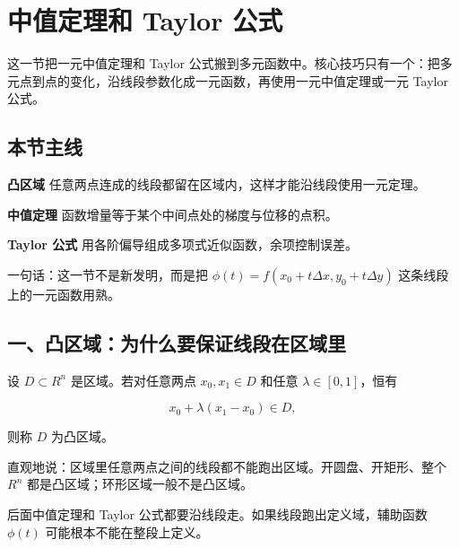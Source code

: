 \section{中值定理和 Taylor 公式}

这一节把一元中值定理和 Taylor 公式搬到多元函数中。核心技巧只有一个：把多元点到点的变化，沿线段参数化成一元函数，再使用一元中值定理或一元 Taylor 公式。

\subsection*{本节主线}

\begin{conceptbox}
\textbf{凸区域}
任意两点连成的线段都留在区域内，这样才能沿线段使用一元定理。
\end{conceptbox}

\begin{conceptbox}
\textbf{中值定理}
函数增量等于某个中间点处的梯度与位移的点积。
\end{conceptbox}

\begin{conceptbox}
\textbf{Taylor 公式}
用各阶偏导组成多项式近似函数，余项控制误差。
\end{conceptbox}

\begin{notebox}
一句话：这一节不是新发明，而是把 \(\phi(t)=f(x_0+t\Delta x,y_0+t\Delta y)\) 这条线段上的一元函数用熟。
\end{notebox}

\subsection*{一、凸区域：为什么要保证线段在区域里}

设 \(D\subset R^n\) 是区域。若对任意两点 \(x_0,x_1\in D\) 和任意 \(\lambda\in[0,1]\)，恒有

\[
      x_0+\lambda(x_1-x_0)\in D,
    \]

则称 \(D\) 为凸区域。

直观地说：区域里任意两点之间的线段都不能跑出区域。开圆盘、开矩形、整个 \(R^n\) 都是凸区域；环形区域一般不是凸区域。

\begin{notebox}
后面中值定理和 Taylor 公式都要沿线段走。如果线段跑出定义域，辅助函数 \(\phi(t)\) 可能根本不能在整段上定义。
\end{notebox}

